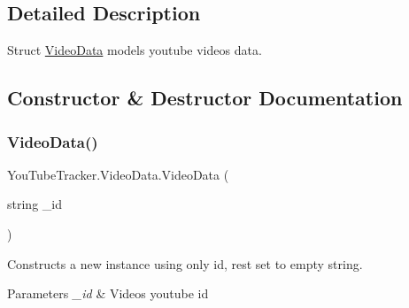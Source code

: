 \subsection{Detailed Description}
Struct {\ttfamily \mbox{\hyperlink{struct_you_tube_tracker_1_1_video_data}{Video\+Data}}} models youtube video\textquotesingle{}s data. 



\subsection{Constructor \& Destructor Documentation}
\mbox{\label{struct_you_tube_tracker_1_1_video_data_ae0bc57a279eeef5070b17086d2a7bcc2}} 
\subsubsection{\texorpdfstring{Video\+Data()}{VideoData()}\hspace{0.1cm}{\footnotesize\ttfamily [1/2]}}
{\footnotesize\ttfamily You\+Tube\+Tracker.\+Video\+Data.\+Video\+Data (\begin{DoxyParamCaption}\item[{string}]{\+\_\+id }\end{DoxyParamCaption})\hspace{0.3cm}{\ttfamily [inline]}}



Constructs a new instance using only id, rest set to empty string. 


\begin{DoxyParams}{Parameters}
{\em \+\_\+id} & Video\textquotesingle{}s youtube id\\
\hline
\end{DoxyParams}
\mbox{\label{struct_you_tube_tracker_1_1_video_data_a5bd160817cfc9b4671d344f9a25b8277}} 
